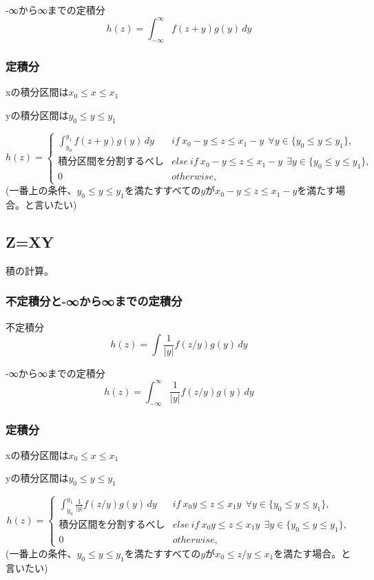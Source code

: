 \documentclass[a4paper,11pt]{ltjsarticle}
\begin{document}
-∞から∞までの定積分
$$
    h(z) = \int_{-\infty}^{\infty} f(z+y) g(y)\,dy
$$
\subsubsection{定積分}
\begin{description}
    \item xの積分区間は$x_0 \leq x \leq x_1$
    \item yの積分区間は$y_0 \leq y \leq y_1$
\end{description}
$$
    h(z)=
    \begin{cases}
        \int_{y_0}^{y_1} f(z+y) g(y)\,dy    & if\ x_0-y \leq z \leq x_1-y \ \ \forall y\in \{ y_0 \leq y \leq y_1\},\\
        積分区間を分割するべし                & else \ if\ x_0-y \leq z \leq x_1-y \ \ \exists y\in \{ y_0 \leq y \leq y_1\}, \\
        0                                   & otherwise,
    \end{cases}
$$
(一番上の条件、$y_0 \leq y \leq y_1$を満たすすべての$y$が$x_0-y \leq z \leq x_1-y$を満たす場合。と言いたい)


\subsection{Z=XY}
積の計算。
\subsubsection{不定積分と-∞から∞までの定積分}
不定積分
$$
    h(z) = \int \frac{1}{|y|} f(z/y) g(y)\,dy
$$

-∞から∞までの定積分
$$
    h(z) = \int_{-\infty}^{\infty} \frac{1}{|y|} f(z/y) g(y)\,dy
$$
\subsubsection{定積分}
\begin{description}
    \item xの積分区間は$x_0 \leq x \leq x_1$
    \item yの積分区間は$y_0 \leq y \leq y_1$
\end{description}
$$
    h(z)=
    \begin{cases}
        \int_{y_0}^{y_1} \frac{1}{|y|} f(z/y) g(y)\,dy  & if\ x_0y \leq z \leq x_1y \ \ \forall y\in \{ y_0 \leq y \leq y_1\},\\
        積分区間を分割するべし                            & else \ if\ x_0y \leq z \leq x_1y \ \ \exists y\in \{ y_0 \leq y \leq y_1\}, \\
        0                                               & otherwise,
    \end{cases}
$$
(一番上の条件、$y_0 \leq y \leq y_1$を満たすすべての$y$が$x_0 \leq z/y \leq x_1$を満たす場合。と言いたい)
\end{document}
